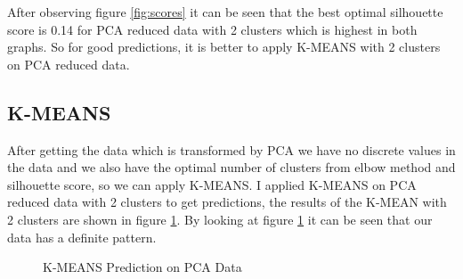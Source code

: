 \documentclass[12pt]{article}
\begin{document}
 After observing figure \ref{fig:scores} it can be seen that the best optimal silhouette score is 0.14 for PCA reduced data with 2 clusters which is highest in both graphs. So for good predictions, it is better to apply K-MEANS with 2 clusters on PCA reduced data.

\subsection{K-MEANS}
After getting the data which is transformed by PCA we have no discrete values in the data and we also have the optimal number of clusters from elbow method and silhouette score, so we can apply K-MEANS. I applied K-MEANS on PCA reduced data with 2 clusters to get predictions, the results of the K-MEAN with 2 clusters are shown in figure \ref{fig:kmeans_result_2d}. By looking at figure \ref{fig:kmeans_result_2d} it can be seen that our data has a definite pattern.
\begin{figure}[h!]
	\centering
	\qquad
	
	\caption{K-MEANS Prediction on PCA Data}%
	\label{fig:kmeans_result_2d}%
\end{figure}
\end{document}
